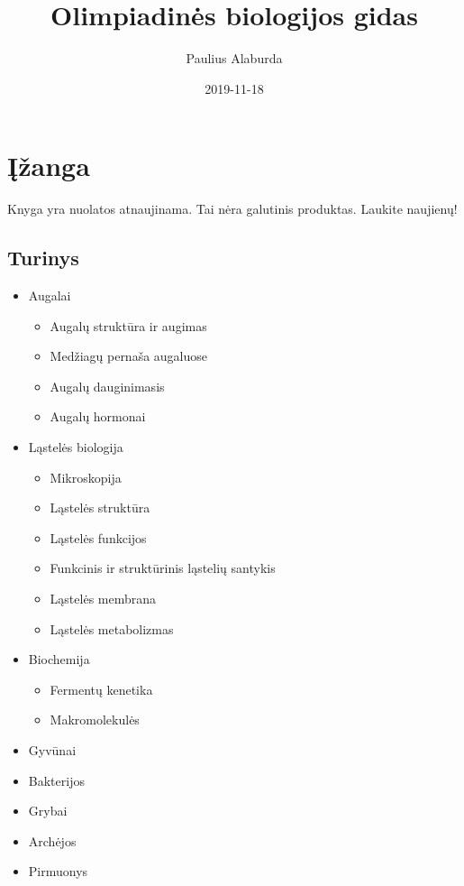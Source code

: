 \documentclass[]{book}
\title{Olimpiadinės biologijos gidas}
\author{Paulius Alaburda}
\date{2019-11-18}
\providecommand{\tightlist}{%
  \setlength{\itemsep}{0pt}\setlength{\parskip}{0pt}}
\begin{document}
\maketitle

{
\setcounter{tocdepth}{1}
\tableofcontents
}
\hypertarget{izanga}{%
\chapter{Įžanga}\label{izanga}}

Knyga yra nuolatos atnaujinama. Tai nėra galutinis produktas. Laukite naujienų!

\hypertarget{turinys}{%
\section{Turinys}\label{turinys}}

\begin{itemize}
\tightlist
\item
  Augalai

  \begin{itemize}
  \tightlist
  \item
    Augalų struktūra ir augimas
  \item
    Medžiagų pernaša augaluose
  \item
    Augalų dauginimasis
  \item
    Augalų hormonai
  \end{itemize}
\item
  Ląstelės biologija

  \begin{itemize}
  \tightlist
  \item
    Mikroskopija
  \item
    Ląstelės struktūra
  \item
    Ląstelės funkcijos
  \item
    Funkcinis ir struktūrinis ląstelių santykis
  \item
    Ląstelės membrana
  \item
    Ląstelės metabolizmas
  \end{itemize}
\item
  Biochemija

  \begin{itemize}
  \tightlist
  \item
    Fermentų kenetika
  \item
    Makromolekulės
  \end{itemize}
\item
  Gyvūnai
\item
  Bakterijos
\item
  Grybai
\item
  Archėjos
\item
  Pirmuonys
\end{itemize}
\end{document}
